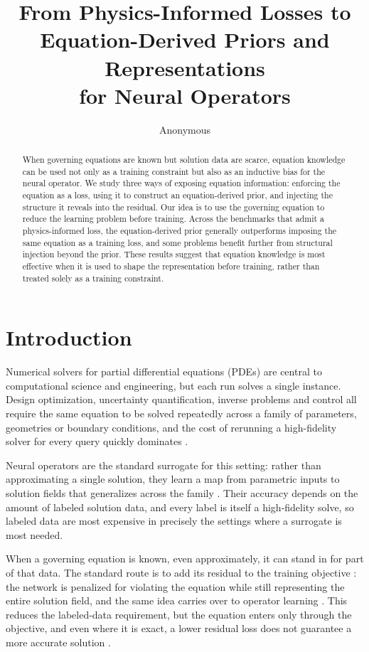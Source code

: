 \documentclass{article}
\title{From Physics-Informed Losses to \\ Equation-Derived Priors and Representations \\ for Neural Operators}
\author{Anonymous}
\begin{document}
\maketitle

\begin{abstract}
When governing equations are known but solution data are scarce, equation knowledge can be used not only as a training constraint but also as an inductive bias for the neural operator. We study three ways of exposing equation information: enforcing the equation as a loss, using it to construct an equation-derived prior, and injecting the structure it reveals into the residual. Our idea is to use the governing equation to reduce the learning problem before training. Across the benchmarks that admit a physics-informed loss, the equation-derived prior generally outperforms imposing the same equation as a training loss, and some problems benefit further from structural injection beyond the prior. These results suggest that equation knowledge is most effective when it is used to shape the representation before training, rather than treated solely as a training constraint.
\end{abstract}


\section{Introduction}
\label{sec:intro}
\vspace{-3mm}
Numerical solvers for partial differential equations (PDEs) are central to computational science and engineering, but each run solves a single instance. Design optimization, uncertainty quantification, inverse problems and control all require the same equation to be solved repeatedly across a family of parameters, geometries or boundary conditions, and the cost of rerunning a high-fidelity solver for every query quickly dominates \citep{forrester2009surrogate,psaros2023uncertainty}.

Neural operators are the standard surrogate for this setting: rather than approximating a single solution, they learn a map from parametric inputs to solution fields that generalizes across the family \citep{lu2021learning,lee2023hyperdeeponet,li2020fourier,hao2023gnot,wang2024cvit}. Their accuracy depends on the amount of labeled solution data, and every label is itself a high-fidelity solve, so labeled data are most expensive in precisely the settings where a surrogate is most needed.

When a governing equation is known, even approximately, it can stand in for part of that data. The standard route is to add its residual to the training objective \citep{raissi2019physics}: the network is penalized for violating the equation while still representing the entire solution field, and the same idea carries over to operator learning \citep{li2024physics,wang2021learning}. This reduces the labeled-data requirement, but the equation enters only through the objective, and even where it is exact, a lower residual loss does not guarantee a more accurate solution \citep{chen2026training}.
\end{document}
